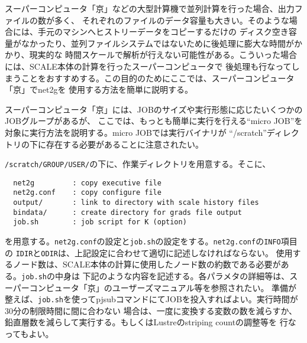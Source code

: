 スーパーコンピュータ「京」などの大型計算機で並列計算を行った場合、出力ファイルの数が多く、
それぞれのファイルのデータ容量も大きい。そのような場合には、手元のマシンへヒストリーデータをコピーするだけの
ディスク空き容量がなかったり、並列ファイルシステムではないために後処理に膨大な時間がかかり、現実的な
時間スケールで解析が行えない可能性がある。こういった場合には、SCALE本体の計算を行ったスーパーコンピュータで
後処理も行なってしまうことをおすすめする。この目的のためにここでは、スーパーコンピュータ「京」でnet2gを
使用する方法を簡単に説明する。

スーパーコンピュータ「京」には、JOBのサイズや実行形態に応じたいくつかのJOBグループがあるが、
ここでは、もっとも簡単に実行を行える``micro JOB''を対象に実行方法を説明する。micro JOBでは実行バイナリが
``/scratch''ディレクトリの下に存在する必要があることに注意されたい。

\verb|/scratch/GROUP/USER/|の下に、作業ディレクトリを用意する。そこに、
\begin{verbatim}
  net2g         : copy executive file
  net2g.conf    : copy configure file
  output/       : link to directory with scale history files
  bindata/      : create directory for grads file output
  job.sh        : job script for K (option)
\end{verbatim}
を用意する。\verb|net2g.conf|の設定と\verb|job.sh|の設定をする。\verb|net2g.conf|の\verb|INFO|項目の
\verb|IDIR|と\verb|ODIR|は、上記設定に合わせて適切に記述しなければならない。
使用するノード数は、SCALE本体の計算に使用したノード数の約数である必要がある。\verb|job.sh|の中身は
下記のような内容を記述する。各パラメタの詳細等は、スーパーコンピュータ「京」のユーザーズマニュアル等を参照されたい。
準備が整えば、\verb|job.sh|を使ってpjsubコマンドにてJOBを投入すればよい。実行時間が30分の制限時間に間に合わない
場合は、一度に変換する変数の数を減らすか、鉛直層数を減らして実行する。もしくはLustreのstriping countの調整等を
行なってもよい。\\

 \\
\\


